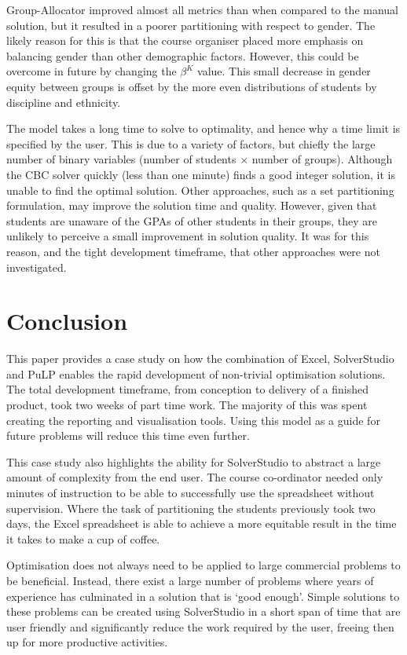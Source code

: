 \documentclass[12pt]{ORSNZ}
\begin{document}
Group-Allocator improved almost all metrics than when compared to the manual solution, but it resulted in a poorer partitioning with respect to gender. The likely reason for this is that the course organiser placed more emphasis on balancing gender than other demographic factors. However, this could be overcome in future by changing the $\beta^K$ value. This small decrease in gender equity between groups is offset by the more even distributions of students by discipline and ethnicity.

The model takes a long time to solve to optimality, and hence why a time limit is specified by the user. This is due to a variety of factors, but chiefly the large number of binary variables (number of students $\times$ number of groups). Although the CBC solver quickly (less than one minute) finds a good integer solution, it is unable to find the optimal solution. Other approaches, such as a set partitioning formulation, may improve the solution time and quality. However, given that students are unaware of the GPAs of other students in their groups, they are unlikely to perceive a small improvement in solution quality. It was for this reason, and the tight development timeframe, that other approaches were not investigated.

\section{Conclusion}
This paper provides a case study on how the combination of Excel, SolverStudio and PuLP enables the rapid development of non-trivial optimisation solutions. The total development timeframe, from conception to delivery of a finished product, took two weeks of part time work. The majority of this was spent creating the reporting and visualisation tools. Using this model as a guide for future problems will reduce this time even further.

This case study also highlights the ability for SolverStudio to abstract a large amount of complexity from the end user. The course co-ordinator needed only minutes of instruction to be able to successfully use the spreadsheet without supervision. Where the task of partitioning the students previously took two days, the Excel spreadsheet is able to achieve a more equitable result in the time it takes to make a cup of coffee.

Optimisation does not always need to be applied to large commercial problems to be beneficial. Instead, there exist a large number of problems where years of experience has culminated in a solution that is `good enough'. Simple solutions to these problems can be created using SolverStudio in a short span of time that are user friendly and significantly reduce the work required by the user, freeing then up for more productive activities.
\end{document}
